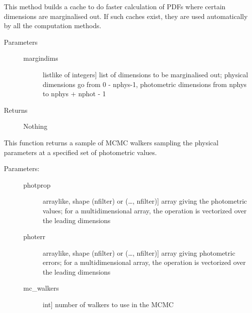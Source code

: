 \documentclass[letterpaper,10pt,english]{sphinxmanual}
\begin{document}
\begin{fulllineitems}
\begin{fulllineitems}
\label{\detokenize{bayesphot:slugpy.bayesphot.bp.bp.make_cache}}
This method builds a cache to do faster calculation of PDFs
where certain dimensions are marginalised out. If such caches
exist, they are used automatically by all the computation
methods.
\begin{description}
\item[{Parameters}] \leavevmode\begin{description}
\item[{margindims}] \leavevmode{[}listlike of integers{]}
list of dimensions to be marginalised out; physical
dimensions go from 0 - nphys-1, photometric dimensions
from nphys to nphys + nphot - 1

\end{description}

\item[{Returns}] \leavevmode
Nothing

\end{description}

\end{fulllineitems}


\begin{fulllineitems}
\label{\detokenize{bayesphot:slugpy.bayesphot.bp.bp.mcmc}}
This function returns a sample of MCMC walkers sampling the
physical parameters at a specified set of photometric values.
\begin{description}
\item[{Parameters:}] \leavevmode\begin{description}
\item[{photprop}] \leavevmode{[}arraylike, shape (nfilter) or (…, nfilter){]}
array giving the photometric values; for a
multidimensional array, the operation is vectorized over
the leading dimensions

\item[{photerr}] \leavevmode{[}arraylike, shape (nfilter) or (…, nfilter){]}
array giving photometric errors; for a multidimensional
array, the operation is vectorized over the leading
dimensions

\item[{mc\_walkers}] \leavevmode{[}int{]}
number of walkers to use in the MCMC


\end{description}
\end{description}
\end{fulllineitems}
\end{fulllineitems}
\end{document}
